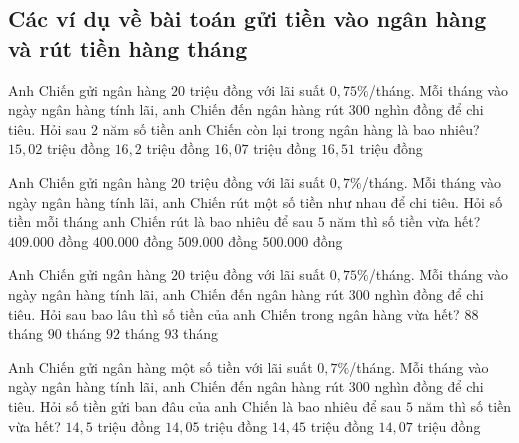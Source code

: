 \subsection{Các ví dụ về bài toán gửi tiền vào ngân hàng và rút tiền hàng tháng}
\begin{vd}%
	Anh Chiến gửi ngân hàng $20$ triệu đồng với lãi suất $0,75\%$/tháng. Mỗi tháng vào ngày ngân hàng tính lãi, anh Chiến đến ngân hàng rút $300$ nghìn đồng để chi tiêu. Hỏi sau $2$ năm số tiền anh Chiến còn lại trong ngân hàng là bao nhiêu?\newline
	\choice
	{$15,02$ triệu đồng}
	{$16,2$ triệu đồng}
	{$16,07$ triệu đồng}
	{$16,51$ triệu đồng}
\end{vd}
\begin{vd}%
	Anh Chiến gửi ngân hàng $20$ triệu đồng với lãi suất $0,7\%$/tháng. Mỗi tháng vào ngày ngân hàng tính lãi, anh Chiến rút một số tiền như nhau để chi tiêu. Hỏi số tiền mỗi tháng anh Chiến rút là bao nhiêu để sau $5$ năm thì số tiền vừa hết?\newline
	\choice
	{\True $409.000$ đồng }
	{$400.000$ đồng}
	{$509.000$ đồng}
	{$500.000$ đồng}
\end{vd}

\begin{vd}%
	Anh Chiến gửi ngân hàng $20$ triệu đồng với lãi suất $0,75\%$/tháng. Mỗi tháng vào ngày ngân hàng tính lãi, anh Chiến đến ngân hàng rút $300$ nghìn đồng để chi tiêu. Hỏi sau bao lâu thì số tiền của anh Chiến trong ngân hàng vừa hết?\newline
	\choice
	{$88$ tháng }
	{$90$ tháng}
	{$92$ tháng}
	{\True $93$ tháng}
\end{vd}

\begin{vd}%
	Anh Chiến gửi ngân hàng một số tiền với lãi suất $0,7\%$/tháng. Mỗi tháng vào ngày ngân hàng tính lãi, anh Chiến đến ngân hàng rút $300$ nghìn đồng để chi tiêu. Hỏi số tiền gửi ban đâu của anh Chiến là bao nhiêu để sau $5$ năm thì số tiền vừa hết?\newline
	\choice
	{$14,5$ triệu đồng }
	{$14,05$ triệu đồng}
	{\True $14,45$ triệu đồng}
	{$14,07$ triệu đồng}
\end{vd}

